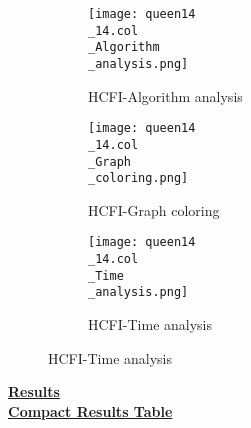 \documentclass[10pt]{article}
\begin{document}
\graphicspath{{./Core1/Solutions/HCFI/queen14\_14.col}}
\begin{figure}[H]
\begin{subfigure}{.33\textwidth}
  \centering
  \texttt{[image: queen14\\\_14.col\\\_Algorithm\\\_analysis.png]}
  \caption{HCFI-Algorithm analysis}
   \label{fig:subfig1}
\end{subfigure}%
\begin{subfigure}{.33\textwidth}
  \centering
  \texttt{[image: queen14\\\_14.col\\\_Graph\\\_coloring.png]}
  \caption{HCFI-Graph coloring}
  \label{fig:subfig2}
\end{subfigure}
\begin{subfigure}{.33\textwidth}
  \centering
  \texttt{[image: queen14\\\_14.col\\\_Time\\\_analysis.png]}
  \caption{HCFI-Time analysis}
  \end{subfigure}
\end{figure}
\vspace{2cm}
\begin{center}
\hyperlink{page.8}{\textbf{Results}}\\
\vspace{0.5cm}
\hyperlink{page.71}{\textbf{Compact Results Table}}
\end{center}
\pagebreak
\end{document}
